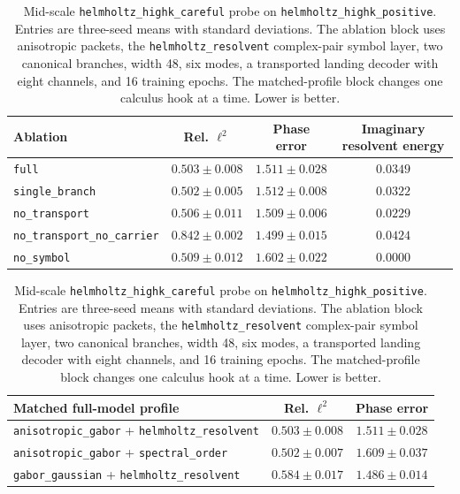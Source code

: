 \begin{table}[t]
\centering
\caption{Mid-scale \texttt{helmholtz\_highk\_careful} probe on \texttt{helmholtz\_highk\_positive}. Entries are three-seed means with standard deviations. The ablation block uses anisotropic packets, the \texttt{helmholtz\_resolvent} complex-pair symbol layer, two canonical branches, width 48, six modes, a transported landing decoder with eight channels, and 16 training epochs. The matched-profile block changes one calculus hook at a time. Lower is better.}
\label{tab:helmholtz-highk-careful-midscale}
\small
\begin{tabular}{lccc}
\toprule
Ablation & Rel. $\ell^2$ & Phase error & Imaginary resolvent energy \\
\midrule
\texttt{full} & $0.503\pm0.008$ & $1.511\pm0.028$ & $0.0349$ \\
\texttt{single\_branch} & $\mathbf{0.502}\pm0.005$ & $1.512\pm0.008$ & $0.0322$ \\
\texttt{no\_transport} & $0.506\pm0.011$ & $\mathbf{1.509}\pm0.006$ & $0.0229$ \\
\texttt{no\_transport\_no\_carrier} & $0.842\pm0.002$ & $1.499\pm0.015$ & $0.0424$ \\
\texttt{no\_symbol} & $0.509\pm0.012$ & $1.602\pm0.022$ & $0.0000$ \\
\bottomrule
\end{tabular}

\vspace{0.6em}
\begin{tabular}{lcc}
\toprule
Matched full-model profile & Rel. $\ell^2$ & Phase error \\
\midrule
\texttt{anisotropic\_gabor} + \texttt{helmholtz\_resolvent} & $0.503\pm0.008$ & $1.511\pm0.028$ \\
\texttt{anisotropic\_gabor} + \texttt{spectral\_order} & $\mathbf{0.502}\pm0.007$ & $1.609\pm0.037$ \\
\texttt{gabor\_gaussian} + \texttt{helmholtz\_resolvent} & $0.584\pm0.017$ & $\mathbf{1.486}\pm0.014$ \\
\bottomrule
\end{tabular}
\end{table}

